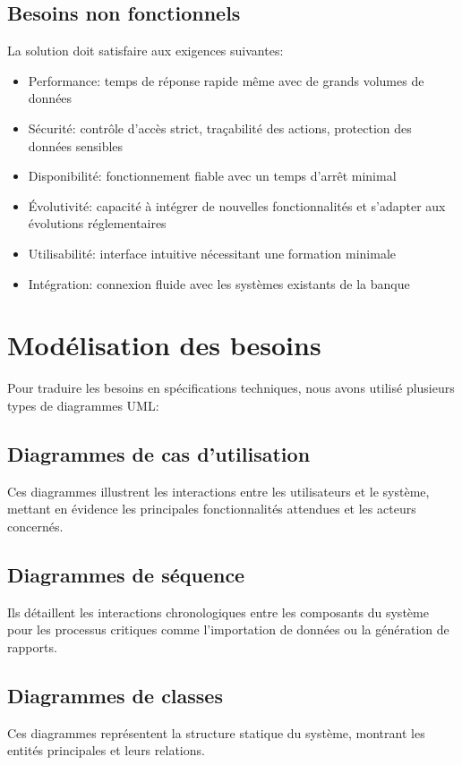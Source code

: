 \documentclass[12pt,a4paper]{report}
\begin{document}
\subsection{Besoins non fonctionnels}
La solution doit satisfaire aux exigences suivantes:
\begin{itemize}
    \item Performance: temps de réponse rapide même avec de grands volumes de données
    \item Sécurité: contrôle d'accès strict, traçabilité des actions, protection des données sensibles
    \item Disponibilité: fonctionnement fiable avec un temps d'arrêt minimal
    \item Évolutivité: capacité à intégrer de nouvelles fonctionnalités et s'adapter aux évolutions réglementaires
    \item Utilisabilité: interface intuitive nécessitant une formation minimale
    \item Intégration: connexion fluide avec les systèmes existants de la banque
\end{itemize}

\section{Modélisation des besoins}
Pour traduire les besoins en spécifications techniques, nous avons utilisé plusieurs types de diagrammes UML:

\subsection{Diagrammes de cas d'utilisation}
Ces diagrammes illustrent les interactions entre les utilisateurs et le système, mettant en évidence les principales fonctionnalités attendues et les acteurs concernés.

\subsection{Diagrammes de séquence}
Ils détaillent les interactions chronologiques entre les composants du système pour les processus critiques comme l'importation de données ou la génération de rapports.

\subsection{Diagrammes de classes}
Ces diagrammes représentent la structure statique du système, montrant les entités principales et leurs relations.
\end{document}
